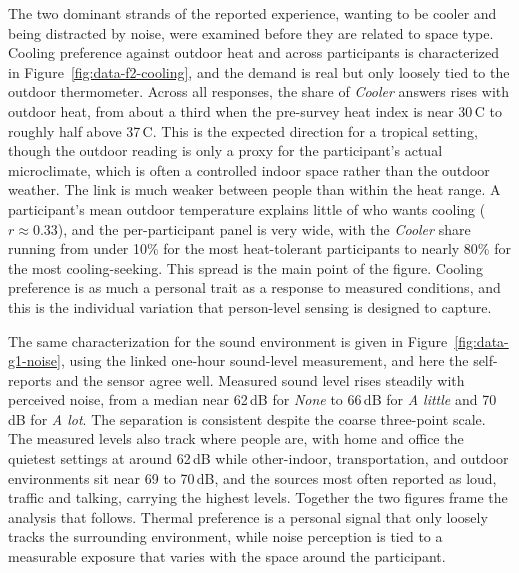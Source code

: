 \documentclass[]{interact}
\begin{document}
The two dominant strands of the reported experience, wanting to be cooler and being distracted by noise, were examined before they are related to space type. 
Cooling preference against outdoor heat and across participants is characterized in Figure~\ref{fig:data-f2-cooling}, and the demand is real but only loosely tied to the outdoor thermometer.
Across all responses, the share of \emph{Cooler} answers rises with outdoor heat, from about a third when the pre-survey heat index is near 30\,\textdegree C to roughly half above 37\,\textdegree C.
This is the expected direction for a tropical setting, though the outdoor reading is only a proxy for the participant's actual microclimate, which is often a controlled indoor space rather than the outdoor weather.
The link is much weaker between people than within the heat range.
A participant's mean outdoor temperature explains little of who wants cooling ($r \approx 0.33$), and the per-participant panel is very wide, with the \emph{Cooler} share running from under 10\% for the most heat-tolerant participants to nearly 80\% for the most cooling-seeking.
This spread is the main point of the figure.
Cooling preference is as much a personal trait as a response to measured conditions, and this is the individual variation that person-level sensing is designed to capture.

The same characterization for the sound environment is given in Figure~\ref{fig:data-g1-noise}, using the linked one-hour sound-level measurement, and here the self-reports and the sensor agree well.
Measured sound level rises steadily with perceived noise, from a median near 62\,dB for \emph{None} to 66\,dB for \emph{A little} and 70\,dB for \emph{A lot}.
The separation is consistent despite the coarse three-point scale.
The measured levels also track where people are, with home and office the quietest settings at around 62\,dB while other-indoor, transportation, and outdoor environments sit near 69 to 70\,dB, and the sources most often reported as loud, traffic and talking, carrying the highest levels.
Together the two figures frame the analysis that follows.
Thermal preference is a personal signal that only loosely tracks the surrounding environment, while noise perception is tied to a measurable exposure that varies with the space around the participant.
\end{document}
